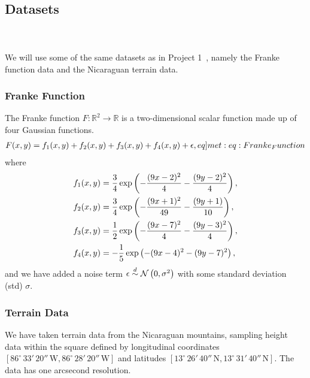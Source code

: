 \\
\subsection{Datasets}
    \\
    \\
    We will use some of the same datasets as in Project 1~\cite{Project1}, namely the Franke function data and the Nicaraguan terrain data.
    \subsubsection{Franke Function}
        The Franke function $F: \mathbb{R}^2 \to \mathbb{R}$ is a two-dimensional scalar function made up of four Gaussian functions.
        \begin{align}
            F(x,y) = f_1(x,y) + f_2(x,y) + f_3(x,y) + f_4(x,y) + \epsilon, \label[eq]{met:eq:Franke_Function}
        \end{align}
        where
        \begin{subequations}
            \begin{align}
                f_1(x,y) &= \frac{3}{4}\operatorname{exp}\left( -\frac{(9x-2)^2}{4} - \frac{(9y-2)^2}{4} \right), \\
                f_2(x,y) &= \frac{3}{4}\operatorname{exp}\left( -\frac{(9x+1)^2}{49} - \frac{(9y+1)}{10} \right), \\
                f_3(x,y) &= \frac{1}{2}\operatorname{exp}\left( -\frac{(9x-7)^2}{4} - \frac{(9y-3)^2}{4} \right), \\
                f_4(x,y) &= -\frac{1}{5}\operatorname{exp}\left( -(9x-4)^2 - (9y-7)^2 \right),
            \end{align}
        \end{subequations}
        and we have added a noise term $\epsilon \overset{d}{\sim} \operatorname{\mathcal{N}}\left(0,\sigma^2\right)$ with some standard deviation (std) $\sigma$.

    \subsubsection{Terrain Data}
        We have taken terrain data from the Nicaraguan mountains, sampling height data within the square defined by longitudinal coordinates $[86^\circ\,33'\,20''\,\text{W}, 86^\circ\,28'\,20''\,\text{W}]$ and latitudes $[13^\circ\,26'\,40''\,\text{N}, 13^\circ\,31'\,40''\,\text{N}]$. The data has one arcsecond resolution.

